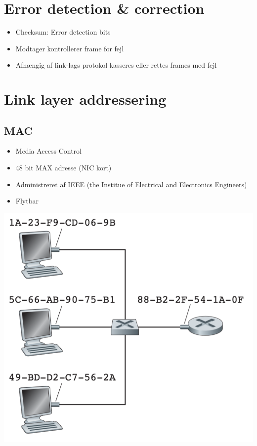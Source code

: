 {\section{Error detection \& correction}
\begin{itemize}
	\item Checksum: Error detection bits
	\item Modtager kontrollerer frame for fejl
	\item Afhængig af link-lags protokol kasseres eller rettes frames med fejl
\end{itemize}

\section{Link layer addressering}
\subsection{MAC}
\begin{itemize}
	\item Media Access Control
	\item 48 bit MAX adresse (NIC kort)
	\item Administreret af IEEE (the Institue of Electrical and Electronics Engineers)
	\item Flytbar
\end{itemize}

{\includegraphics{5-data-link-layer/mac.png}

}}
